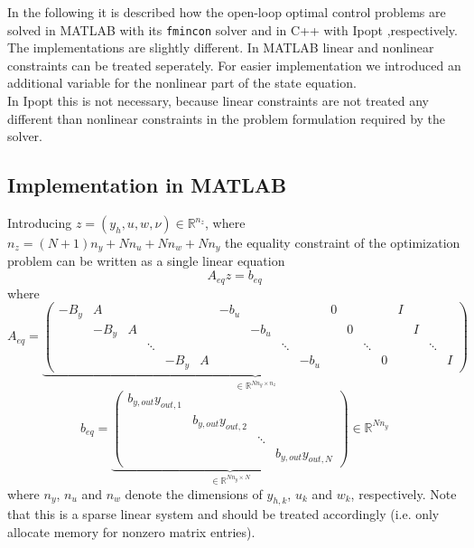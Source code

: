 \documentclass[
12pt, %
a4paper, %
onecolumn, %
portrait %
]{article}
\begin{document}
In the following it is described how the open-loop optimal control problems are solved in MATLAB with its \texttt{fmincon} solver and in C++ with Ipopt ,respectively. The implementations are slightly different. In MATLAB linear and nonlinear constraints can be treated seperately. For easier implementation we introduced an additional variable for the nonlinear part of the state equation.\\
In Ipopt this is not necessary, because linear constraints are not treated any different than nonlinear constraints in the problem formulation required by the solver.
\subsection{Implementation in MATLAB}
Introducing $z = (y_h, u, w, \nu) \in \mathbb{R}^{n_z}$, where $n_z = (N+1)n_y + N n_u  + N n_w + N n_y$ the equality constraint of the optimization problem can be written as a single linear equation 
\begin{equation}
A_{eq} z = b_{eq}
\label{eq:matlab-linear-system-constraints}
\end{equation}
where
\begin{equation}
A_{eq} =
\underbrace{\begin{pmatrix}
-B_y &    A &   &        & 		 &   & -b_u &      &        &      & 0 &   &       &   & I &   &        & \\
     & -B_y & A &        & 		 &   &      & -b_u &        &      &   & 0 &       &   &   & I &        & \\
     &      &   & \ddots &      &   &      &      & \ddots & 	    &   &   &\ddots &   &   &   & \ddots & \\
     &      &   &        & -B_y & A &      &      &        & -b_u &   &   &       & 0 &   &   &        & I 
\end{pmatrix}}_{
\in \mathbb{R}^{N n_y \times n_z}}
\end{equation}
\begin{equation}
b_{eq} = 
\underbrace{\begin{pmatrix}
b_{y,out}y_{out,1} & & & \\
& b_{y,out}y_{out,2} & &  \\
& & \ddots & \\
& & & b_{y,out}y_{out,N}
\end{pmatrix}}_{
\in \mathbb{R}^{N n_y \times N}
}
  \in \mathbb{R}^{N n_y}
\end{equation}
where $n_y$, $n_u$ and $n_w$ denote the dimensions of $y_{h,k}$, $u_k$ and $w_k$, respectively.
Note that this is a sparse linear system and should be treated accordingly (i.e. only allocate memory for nonzero matrix entries).
\end{document}
